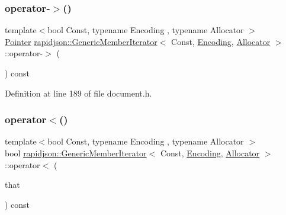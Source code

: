 \subsubsection{\texorpdfstring{operator-\/$>$()}{operator->()}}
{\footnotesize\ttfamily template$<$bool Const, typename Encoding , typename Allocator $>$ \\
\mbox{\hyperlink{classrapidjson_1_1_generic_member_iterator_aa9d53504374c7c6bdf46775482c5b107}{Pointer}} \mbox{\hyperlink{classrapidjson_1_1_generic_member_iterator}{rapidjson\+::\+Generic\+Member\+Iterator}}$<$ Const, \mbox{\hyperlink{classrapidjson_1_1_encoding}{Encoding}}, \mbox{\hyperlink{classrapidjson_1_1_allocator}{Allocator}} $>$\+::operator-\/$>$ (\begin{DoxyParamCaption}{ }\end{DoxyParamCaption}) const}



Definition at line 189 of file document.\+h.


\begin{DoxyCode}{0}

\end{DoxyCode}
\mbox{\label{classrapidjson_1_1_generic_member_iterator_ae40f615a3674f3d387cba9fac217a30b}} 
\subsubsection{\texorpdfstring{operator$<$()}{operator<()}}
{\footnotesize\ttfamily template$<$bool Const, typename Encoding , typename Allocator $>$ \\
bool \mbox{\hyperlink{classrapidjson_1_1_generic_member_iterator}{rapidjson\+::\+Generic\+Member\+Iterator}}$<$ Const, \mbox{\hyperlink{classrapidjson_1_1_encoding}{Encoding}}, \mbox{\hyperlink{classrapidjson_1_1_allocator}{Allocator}} $>$\+::operator$<$ (\begin{DoxyParamCaption}\item[{\mbox{\hyperlink{classrapidjson_1_1_generic_member_iterator_a61b9a9ba8a5917d90406532f104605cc}{Const\+Iterator}}}]{that }\end{DoxyParamCaption}) const}



